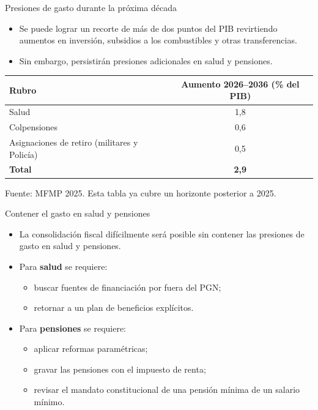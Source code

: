 \begin{frame}{Presiones de gasto durante la próxima década}
\small
\begin{itemize}
  \item Se puede lograr un recorte de más de dos puntos del PIB revirtiendo aumentos en inversión, subsidios a los combustibles y otras transferencias.
  \item Sin embargo, persistirán presiones adicionales en salud y pensiones.
\end{itemize}
\centering
\begin{tabular}{lc}
\toprule
\textbf{Rubro} & \textbf{Aumento 2026--2036 (\% del PIB)} \\
\midrule
Salud & 1,8 \\
Colpensiones & 0,6 \\
Asignaciones de retiro (militares y Policía) & 0,5 \\
\midrule
\textbf{Total} & \textbf{2,9} \\
\bottomrule
\end{tabular}

\vfill
\scriptsize Fuente: MFMP 2025. Esta tabla ya cubre un horizonte posterior a 2025.
\end{frame}

\begin{frame}{Contener el gasto en salud y pensiones}
\begin{itemize}
  \item La consolidación fiscal difícilmente será posible sin contener las presiones de gasto en salud y pensiones.
  \item Para \textbf{salud} se requiere:
  \begin{itemize}
    \item buscar fuentes de financiación por fuera del PGN;
    \item retornar a un plan de beneficios explícitos.
  \end{itemize}
  \item Para \textbf{pensiones} se requiere:
  \begin{itemize}
    \item aplicar reformas paramétricas;
    \item gravar las pensiones con el impuesto de renta;
    \item revisar el mandato constitucional de una pensión mínima de un salario mínimo.
  \end{itemize}
\end{itemize}
\end{frame}


